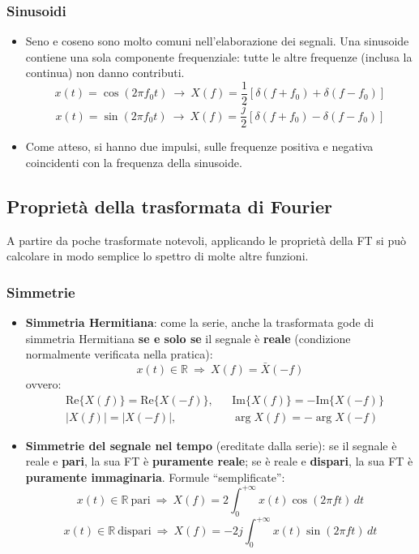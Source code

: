 \documentclass[12pt, a4paper]{article}
\begin{document}
\subsubsection{Sinusoidi}
\begin{itemize}
    \item Seno e coseno sono molto comuni nell'elaborazione dei segnali. Una sinusoide contiene una sola componente frequenziale: tutte le altre frequenze (inclusa la continua) non danno contributi.
    $$x(t)=\cos(2\pi f_0t)\ \longrightarrow\ X(f)=\frac12\left[\delta(f+f_0)+\delta(f-f_0)\right]$$
    $$x(t)=\sin(2\pi f_0t)\ \longrightarrow\ X(f)=\frac j2\left[\delta(f+f_0)-\delta(f-f_0)\right]$$
    \item Come atteso, si hanno due impulsi, sulle frequenze positiva e negativa coincidenti con la frequenza della sinusoide.
\end{itemize}

\subsection{Proprietà della trasformata di Fourier}
A partire da poche trasformate notevoli, applicando le proprietà della FT si può calcolare in modo semplice lo spettro di molte altre funzioni.

\subsubsection{Simmetrie}
\begin{itemize}
    \item \textbf{Simmetria Hermitiana}: come la serie, anche la trasformata gode di simmetria Hermitiana \textbf{se e solo se} il segnale è \textbf{reale} (condizione normalmente verificata nella pratica):
    $$x(t)\in\mathbb{R}\ \Longrightarrow\ X(f)=\bar{X}(-f)$$
    ovvero:
    \begin{align*}
        &\text{Re}\{X(f)\}=\text{Re}\{X(-f)\}, &&\text{Im}\{X(f)\}=-\text{Im}\{X(-f)\}\\
        &|X(f)|=|X(-f)|, &&\arg X(f)=-\arg X(-f)
    \end{align*}
    \item \textbf{Simmetrie del segnale nel tempo} (ereditate dalla serie): se il segnale è reale e \textbf{pari}, la sua FT è \textbf{puramente reale}; se è reale e \textbf{dispari}, la sua FT è \textbf{puramente immaginaria}. Formule ``semplificate'':
    $$x(t)\in\mathbb{R}\ \text{pari}\ \Longrightarrow\ X(f)=2\int_0^{+\infty}x(t)\cos(2\pi ft)\,dt$$
    $$x(t)\in\mathbb{R}\ \text{dispari}\ \Longrightarrow\ X(f)=-2j\int_0^{+\infty}x(t)\sin(2\pi ft)\,dt$$
\end{itemize}
\end{document}
